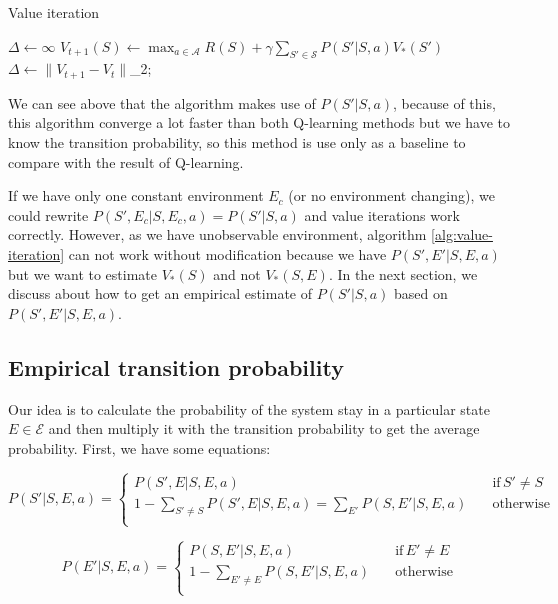\documentclass[
  a4paper, xcolor = usenames,dvipsnames]{article}
\theoremstyle{definition}
\theoremstyle{definition}
\theoremstyle{definition}
\theoremstyle{definition}
\theoremstyle{remark}
\begin{document}
\begin{algorithm}
\caption{Value iteration} \label{alg:value-iteration}
$\Delta \gets \infty$\;
\While {\Delta > \epsilon} {
   {
    $V_{t+1}(S) \gets \max_{a \in \mathcal{A}} R(S) + \gamma \sum_{S' \in \mathcal{S}} P(S' | S, a) V_{*}(S')$\;
  }
  $\Delta \gets \lVert V_{t + 1} - V_{t} \rVert$\_{2};
}
\end{algorithm}

We can see above that the algorithm makes use of \(P(S' | S, a)\), because of this, this algorithm converge a lot faster than both Q-learning methods but we have to know the transition probability, so this method is use only as a baseline to compare with the result of Q-learning.

If we have only one constant environment \(E_{c}\) (or no environment changing), we could rewrite \(P(S', E_{c} | S, E_{c}, a) = P(S' | S, a)\) and value iterations work correctly. However, as we have unobservable environment, algorithm \ref{alg:value-iteration} can not work without modification because we have \(P(S', E' | S, E, a)\) but we want to estimate \(V_{*}(S)\) and not \(V_{*}(S, E)\). In the next section, we discuss about how to get an empirical estimate of \(P(S'|S, a)\) based on \(P(S', E' | S, E, a)\).

\hypertarget{empirical-transition-probability}{%
\subsection{Empirical transition probability}\label{empirical-transition-probability}}

Our idea is to calculate the probability of the system stay in a particular state \(E \in \mathcal{E}\) and then multiply it with the transition probability to get the average probability. First, we have some equations:

\begin{equation}
  P(S'|S, E, a) = 
    \begin{cases}
        P(S', E|S, E, a) \quad & \text{if} \, S' \neq S \\
        1 - \sum_{S' \neq S} P(S', E|S, E, a) = \sum_{E'} P(S, E'|S, E, a) \quad & \text{otherwise} \\
    \end{cases}
\label{eq:p-s}
\end{equation}

\begin{equation}
  P(E'|S, E, a) = 
    \begin{cases}
        P(S, E'|S, E, a) \quad & \text{if} \, E' \neq E \\
        1 - \sum_{E' \neq E} P(S, E'|S, E, a) \quad & \text{otherwise} \\
    \end{cases}
\label{eq:p-e}
\end{equation}
\end{document}
